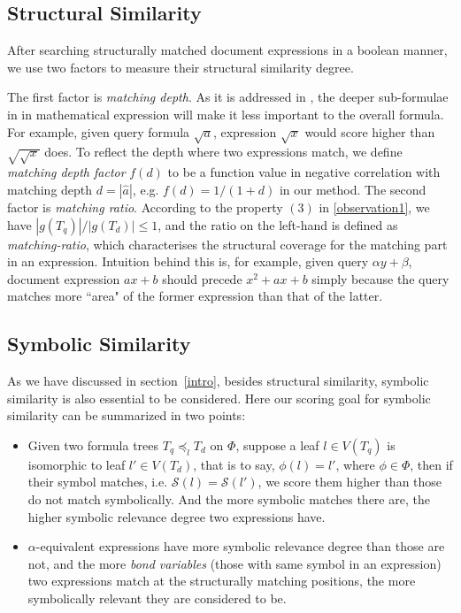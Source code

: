 \documentclass{acm_proc_article-sp}
\begin{document}
\subsection{Structural Similarity}
After searching structurally matched document expressions in a boolean manner, we use two factors to measure their structural similarity degree. 

The first factor is \textit{matching depth}.
As it is addressed in \cite{mias11a}, the deeper sub-formulae in in mathematical expression will make it less important to the overall formula.
For example, given query formula $\sqrt a$, expression $\sqrt {x}$ would score higher than $\sqrt{\sqrt{x}}$ does. 
To reflect the depth where two expressions match, we define \textit{matching depth factor} $f(d)$ to be a function value in negative correlation with matching depth $d = |\hat{a}|$, e.g. $f(d) = 1/(1 + d)$ in our method.
The second factor is \textit{matching ratio}. According to the property $(3)$ in \ref{observation1}, 
we have $|g(T_q)| / |g(T_d)| \le 1$, and the ratio on the left-hand is defined as \textit{matching-ratio}, which characterises the structural coverage for the matching part in an expression.
Intuition behind this is, for example, given query $\alpha y + \beta$, document expression $ax + b$ should precede $x^2 + ax + b$ simply because the query matches more ``area" of the former expression than that of the latter.

\subsection{Symbolic Similarity}
As we have discussed in section~\ref{intro}, besides structural similarity, symbolic similarity is also essential to be considered.
Here our scoring goal for symbolic similarity can be summarized in two points:
\begin{itemize}
\item Given two formula trees
$T_q \preceq_l T_d$ on $\Phi$,  
suppose a leaf $l \in V(T_q)$ is isomorphic to leaf $l' \in V(T_d)$, that is to say, $\phi(l)=l'$, where $\phi \in \Phi$, then if their symbol matches, i.e. $\mathcal{S}(l) = \mathcal{S}(l')$, we score them higher than those do not match symbolically. And the more symbolic matches there are, the higher symbolic relevance degree two expressions have.
\item $\alpha$-equivalent expressions have more symbolic relevance degree than those are not, and the more \textit{bond variables} (those with same symbol in an expression) two expressions match at the structurally matching positions, the more symbolically relevant they are considered to be.
\end{itemize}
\end{document}
